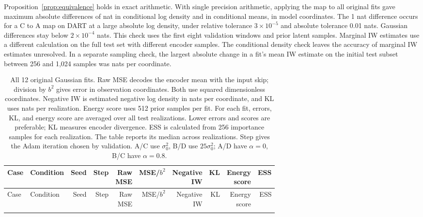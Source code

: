 \documentclass{article}
\begin{document}
Proposition~\ref{prop:equivalence} holds in exact arithmetic. With single precision arithmetic, applying the map to all \PrigmJobCount{} original fits gave maximum absolute differences of \PrigmMaxMappedLogDensityError{} nat in conditional log density and \PrigmMaxMappedSampleMeanError{} in conditional means, in model coordinates. The 1 nat difference occurs for a C to A map on DART at a large absolute log density, under relative tolerance $3\times10^{-5}$ and absolute tolerance 0.01 nats. Gaussian differences stay below $2\times10^{-4}$ nats. This check uses the first eight validation windows and prior latent samples. Marginal IW estimates use a different calculation on the full test set with different encoder samples. The conditional density check leaves the accuracy of marginal IW estimates unresolved. In a separate sampling check, the largest absolute change in a fit's mean IW estimate on the initial test subset between 256 and 1,024 samples was \PrigmMaxAbsStabilityScoreChange{} nats per coordinate.

\begingroup
\setlength{\tabcolsep}{3pt}
\begin{longtable}{llrrrrrrrr}
\caption{All 12 original Gaussian fits. Raw MSE decodes the encoder mean with the input skip; division by $b^2$ gives error in observation coordinates. Both use squared dimensionless coordinates. Negative IW is estimated negative log density in nats per coordinate, and KL uses nats per realization. Energy score uses 512 prior samples per fit. For each fit, errors, KL, and energy score are averaged over all test realizations. Lower errors and scores are preferable; KL measures encoder divergence. ESS is calculated from 256 importance samples for each realization. The table reports its median across realizations. Step gives the Adam iteration chosen by validation. A/C use $\sigma_0^2$, B/D use $25\sigma_0^2$; A/D have $\alpha=0$, B/C have $\alpha=0.8$.}\\
\toprule
Case & Condition & Seed & Step & \shortstack{Raw\\MSE} & MSE/$b^2$ & \shortstack{Negative\\IW} & KL & \shortstack{Energy\\score} & ESS\\
\midrule
\endfirsthead
\toprule
Case & Condition & Seed & Step & \shortstack{Raw\\MSE} & MSE/$b^2$ & \shortstack{Negative\\IW} & KL & \shortstack{Energy\\score} & ESS\\
\midrule
\endhead
\\
\bottomrule
\end{longtable}
\endgroup
\end{document}

